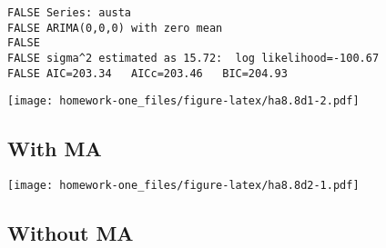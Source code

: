 \documentclass[openany]{book}
\newenvironment{Shaded}{\begin{snugshade}}{\end{snugshade}}
\newcommand{\DataTypeTok}[1]{\textcolor[rgb]{0.13,0.29,0.53}{#1}}
\newcommand{\DecValTok}[1]{\textcolor[rgb]{0.00,0.00,0.81}{#1}}
\newcommand{\KeywordTok}[1]{\textcolor[rgb]{0.13,0.29,0.53}{\textbf{#1}}}
\newcommand{\NormalTok}[1]{#1}
\newcommand{\OperatorTok}[1]{\textcolor[rgb]{0.81,0.36,0.00}{\textbf{#1}}}
\newcommand{\StringTok}[1]{\textcolor[rgb]{0.31,0.60,0.02}{#1}}
\begin{document}
\begin{verbatim}
FALSE Series: austa 
FALSE ARIMA(0,0,0) with zero mean 
FALSE 
FALSE sigma^2 estimated as 15.72:  log likelihood=-100.67
FALSE AIC=203.34   AICc=203.46   BIC=204.93
\end{verbatim}

\begin{Shaded}
\end{Shaded}

\texttt{[image: homework-one\_files/figure-latex/ha8.8d1-2.pdf]}

\hypertarget{with-ma-1}{%
\subsection{With MA}\label{with-ma-1}}

\begin{Shaded}
\end{Shaded}

\texttt{[image: homework-one\_files/figure-latex/ha8.8d2-1.pdf]}

\hypertarget{without-ma-1}{%
\subsection{Without MA}\label{without-ma-1}}

\begin{Shaded}
\end{Shaded}
\end{document}

